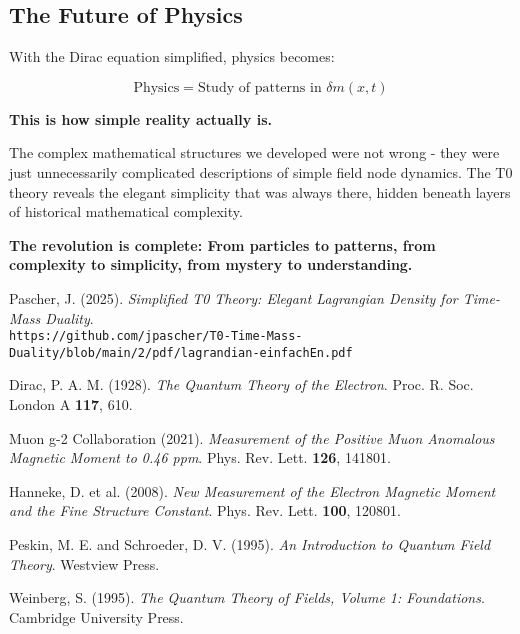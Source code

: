 \documentclass[12pt,a4paper]{article}
\newcommand{\deltam}{\delta m}
\theoremstyle{definition}
\theoremstyle{remark}
\begin{document}
	\subsection{The Future of Physics}
	
	With the Dirac equation simplified, physics becomes:
	
	\begin{equation}
		\boxed{\text{Physics} = \text{Study of patterns in } \deltam(x,t)}
	\end{equation}
	
	\textbf{This is how simple reality actually is.}
	
	The complex mathematical structures we developed were not wrong - they were just unnecessarily complicated descriptions of simple field node dynamics. The T0 theory reveals the elegant simplicity that was always there, hidden beneath layers of historical mathematical complexity.
	
	\textbf{The revolution is complete: From particles to patterns, from complexity to simplicity, from mystery to understanding.}
	
	\begin{thebibliography}{99}
		Pascher, J. (2025). \textit{Simplified T0 Theory: Elegant Lagrangian Density for Time-Mass Duality}. \\
		\texttt{https://github.com/jpascher/T0-Time-Mass-Duality/blob/main/2/pdf/lagrandian-einfachEn.pdf}
		
		Dirac, P. A. M. (1928). \textit{The Quantum Theory of the Electron}. Proc. R. Soc. London A \textbf{117}, 610.
		
		Muon g-2 Collaboration (2021). \textit{Measurement of the Positive Muon Anomalous Magnetic Moment to 0.46 ppm}. Phys. Rev. Lett. \textbf{126}, 141801.
		
		Hanneke, D. et al. (2008). \textit{New Measurement of the Electron Magnetic Moment and the Fine Structure Constant}. Phys. Rev. Lett. \textbf{100}, 120801.
		
		Peskin, M. E. and Schroeder, D. V. (1995). \textit{An Introduction to Quantum Field Theory}. Westview Press.
		
		Weinberg, S. (1995). \textit{The Quantum Theory of Fields, Volume 1: Foundations}. Cambridge University Press.
	\end{thebibliography}
	
\end{document}
